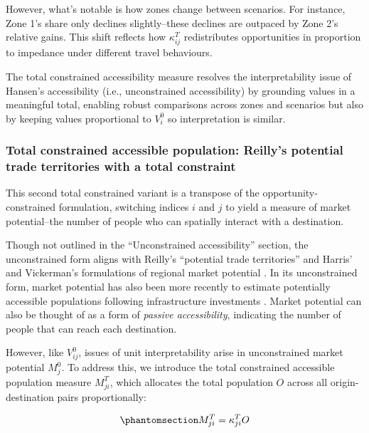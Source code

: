\documentclass[
  10pt,
  letterpaper,
]{article}
\begin{document}
However, what's notable is how zones change between scenarios. For
instance, Zone 1's share only declines slightly--these declines are
outpaced by Zone 2's relative gains. This shift reflects how
\(\kappa_{ij}^T\) redistributes opportunities in proportion to impedance
under different travel behaviours.

The total constrained accessibility measure resolves the
interpretability issue of Hansen's accessibility (i.e., unconstrained
accessibility) by grounding values in a meaningful total, enabling
robust comparisons across zones and scenarios but also by keeping values
proportional to \(V_i^0\) so interpretation is similar.

\subsubsection{Total constrained accessible population: Reilly's
potential trade territories with a total
constraint}\label{total-constrained-accessible-population-reillys-potential-trade-territories-with-a-total-constraint}

This second total constrained variant is a transpose of the
opportunity-constrained formulation, switching indices \(i\) and \(j\)
to yield a measure of market potential--the number of people who can
spatially interact with a destination.

Though not outlined in the ``Unconstrained accessibility'' section, the
unconstrained form aligns with Reilly's ``potential trade territories''
\citep{reilly1929methods} and Harris' and Vickerman's formulations of
regional market potential
\citep{harris_market_1954, vickermanAccessibilityAttractionPotential1974}.
In its unconstrained form, market potential has also been more recently
to estimate potentially accessible populations following infrastructure
investments
\citep[e.g.,][]{gutierrezLocationEconomicPotential2001, holl2007twenty, condecco2018road}.
Market potential can also be thought of as a form of \emph{passive
accessibility}, indicating the number of people that can reach each
destination.

However, like \(V_{ij}^0\), issues of unit interpretability arise in
unconstrained market potential \(M_j^0\). To address this, we introduce
the total constrained accessible population measure \(M^T_{ji}\), which
allocates the total population \(O\) across all origin-destination pairs
proportionally:

\begin{equation}\phantomsection\label{eq-total-constrained-market}{
M^T_{ji} = \kappa_{ji}^T O
}\end{equation}
\end{document}

